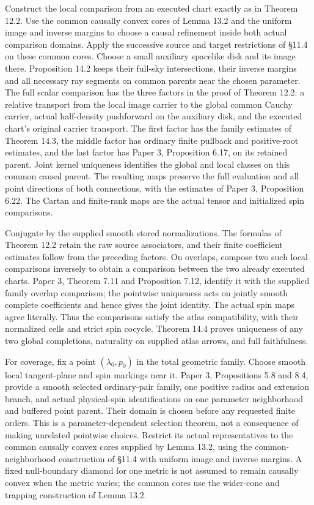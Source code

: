 \documentclass[
  english,
  11pt,
  reqno]{amsart}
\begin{document}
Construct the local comparison from an executed chart exactly as in
Theorem 12.2. Use the common causally convex cores of Lemma 13.2 and the
uniform image and inverse margins to choose a causal refinement inside
both actual comparison domains. Apply the successive source and target
restrictions of §11.4 on these common cores. Choose a small auxiliary
spacelike disk and its image there. Proposition 14.2 keeps their
full-sky intersections, their inverse margins and all necessary ray
segments on common parents near the chosen parameter. The full scalar
comparison has the three factors in the proof of Theorem 12.2: a
relative transport from the local image carrier to the global common
Cauchy carrier, actual half-density pushforward on the auxiliary disk,
and the executed chart's original carrier transport. The first factor
has the family estimates of Theorem 14.3, the middle factor has ordinary
finite pullback and positive-root estimates, and the last factor has
Paper 3, Proposition 6.17, on its retained parent. Joint kernel
uniqueness identifies the global and local classes on this common causal
parent. The resulting maps preserve the full evaluation and all point
directions of both connections, with the estimates of Paper 3,
Proposition 6.22. The Cartan and finite-rank maps are the actual tensor
and initialized spin comparisons.

Conjugate by the supplied smooth stored normalizations. The formulas of
Theorem 12.2 retain the raw source associators, and their finite
coefficient estimates follow from the preceding factors. On overlaps,
compose two such local comparisons inversely to obtain a comparison
between the two already executed charts. Paper 3, Theorem 7.11 and
Proposition 7.12, identify it with the supplied family overlap
comparison; the pointwise uniqueness acts on jointly smooth complete
coefficients and hence gives the joint identity. The actual spin maps
agree literally. Thus the comparisons satisfy the atlas compatibility,
with their normalized cells and strict spin cocycle. Theorem 14.4 proves
uniqueness of any two global completions, naturality on supplied atlas
arrows, and full faithfulness.

For coverage, fix a point \((\lambda_0,p_0)\) in the total geometric
family. Choose smooth local tangent-plane and spin markings near it.
Paper 3, Propositions 5.8 and 8.4, provide a smooth selected
ordinary-pair family, one positive radius and extension branch, and
actual physical-spin identifications on one parameter neighborhood and
buffered point parent. Their domain is chosen before any requested
finite orders. This is a parameter-dependent selection theorem, not a
consequence of making unrelated pointwise choices. Restrict its actual
representatives to the common causally convex cores supplied by Lemma
13.2, using the common-neighborhood construction of §11.4 with uniform
image and inverse margins. A fixed null-boundary diamond for one metric
is not assumed to remain causally convex when the metric varies; the
common cores use the wider-cone and trapping construction of Lemma 13.2.
\end{document}
